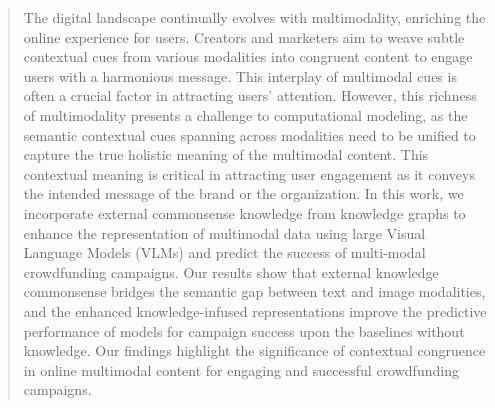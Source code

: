 \documentclass[sigconf]{acmart}
\begin{document}
\begin{abstract}
The digital landscape continually evolves with multimodality, enriching the online experience for users. Creators and marketers aim to weave subtle contextual cues from various modalities into congruent content to engage users with a harmonious message. This interplay of multimodal cues is often a crucial factor in attracting users' attention. However, this richness of multimodality presents a challenge to computational modeling, as the semantic contextual cues spanning across modalities need to be unified to capture the true holistic meaning of the multimodal content. This contextual meaning is critical in attracting user engagement as it conveys the intended message of the brand or the organization. 
In this work, we incorporate external commonsense knowledge from knowledge graphs to enhance the representation of multimodal data using large Visual Language Models (VLMs) and predict the success of multi-modal crowdfunding campaigns. Our results show that external knowledge commonsense bridges the semantic gap between text and image modalities, and the enhanced knowledge-infused representations improve the predictive performance of models for campaign success upon the baselines without knowledge. Our findings highlight the significance of contextual congruence in online multimodal content for engaging and successful crowdfunding campaigns.
% 

\end{abstract}
\end{document}
